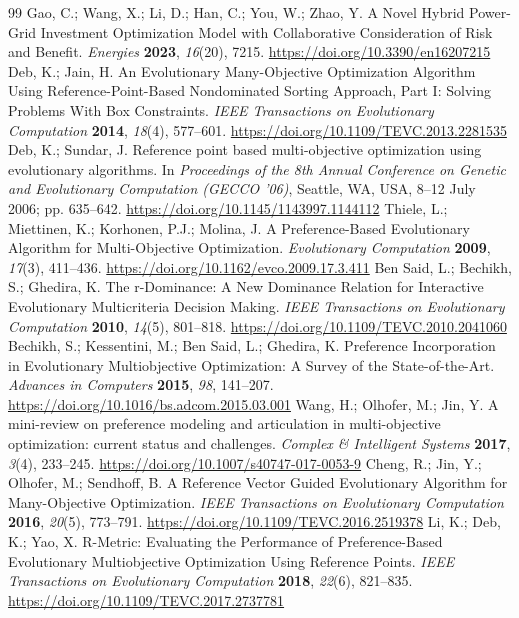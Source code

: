 \documentclass[energies,article,submit,moreauthors]{Definitions/mdpi}
\begin{document}
\begin{thebibliography}{99}
 Gao, C.; Wang, X.; Li, D.; Han, C.; You, W.; Zhao, Y. A Novel Hybrid Power-Grid Investment Optimization Model with Collaborative Consideration of Risk and Benefit. \emph{Energies} \textbf{2023}, \emph{16}(20), 7215. \url{https://doi.org/10.3390/en16207215}
 Deb, K.; Jain, H. An Evolutionary Many-Objective Optimization Algorithm Using Reference-Point-Based Nondominated Sorting Approach, Part I: Solving Problems With Box Constraints. \emph{IEEE Transactions on Evolutionary Computation} \textbf{2014}, \emph{18}(4), 577--601. \url{https://doi.org/10.1109/TEVC.2013.2281535}
 Deb, K.; Sundar, J. Reference point based multi-objective optimization using evolutionary algorithms. In \emph{Proceedings of the 8th Annual Conference on Genetic and Evolutionary Computation (GECCO '06)}, Seattle, WA, USA, 8--12 July 2006; pp. 635--642. \url{https://doi.org/10.1145/1143997.1144112}
 Thiele, L.; Miettinen, K.; Korhonen, P.J.; Molina, J. A Preference-Based Evolutionary Algorithm for Multi-Objective Optimization. \emph{Evolutionary Computation} \textbf{2009}, \emph{17}(3), 411--436. \url{https://doi.org/10.1162/evco.2009.17.3.411}
 Ben Said, L.; Bechikh, S.; Ghedira, K. The r-Dominance: A New Dominance Relation for Interactive Evolutionary Multicriteria Decision Making. \emph{IEEE Transactions on Evolutionary Computation} \textbf{2010}, \emph{14}(5), 801--818. \url{https://doi.org/10.1109/TEVC.2010.2041060}
 Bechikh, S.; Kessentini, M.; Ben Said, L.; Ghedira, K. Preference Incorporation in Evolutionary Multiobjective Optimization: A Survey of the State-of-the-Art. \emph{Advances in Computers} \textbf{2015}, \emph{98}, 141--207. \url{https://doi.org/10.1016/bs.adcom.2015.03.001}
 Wang, H.; Olhofer, M.; Jin, Y. A mini-review on preference modeling and articulation in multi-objective optimization: current status and challenges. \emph{Complex \& Intelligent Systems} \textbf{2017}, \emph{3}(4), 233--245. \url{https://doi.org/10.1007/s40747-017-0053-9}
 Cheng, R.; Jin, Y.; Olhofer, M.; Sendhoff, B. A Reference Vector Guided Evolutionary Algorithm for Many-Objective Optimization. \emph{IEEE Transactions on Evolutionary Computation} \textbf{2016}, \emph{20}(5), 773--791. \url{https://doi.org/10.1109/TEVC.2016.2519378}
 Li, K.; Deb, K.; Yao, X. R-Metric: Evaluating the Performance of Preference-Based Evolutionary Multiobjective Optimization Using Reference Points. \emph{IEEE Transactions on Evolutionary Computation} \textbf{2018}, \emph{22}(6), 821--835. \url{https://doi.org/10.1109/TEVC.2017.2737781}

\end{thebibliography}
\end{document}
